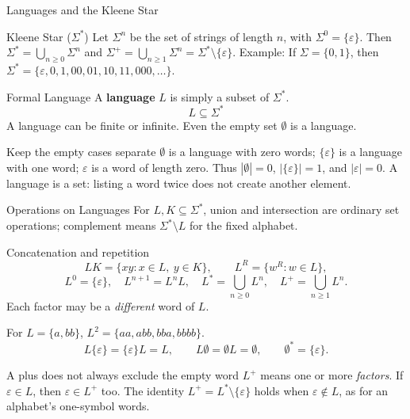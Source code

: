 \documentclass[10pt]{beamer}
\begin{document}
\begin{frame}{Languages and the Kleene Star}
  \small
  \begin{block}{Kleene Star ($\Sigma^*$)}
    Let $\Sigma^n$ be the set of strings of length $n$, with
    $\Sigma^0=\{\varepsilon\}$. Then
    $\Sigma^*=\bigcup_{n\ge0}\Sigma^n$ and
    $\Sigma^+=\bigcup_{n\ge1}\Sigma^n=\Sigma^*\setminus\{\varepsilon\}$.
    \newline Example: If $\Sigma = \{0, 1\}$, then $\Sigma^* = \{\varepsilon, 0, 1, 00, 01, 10, 11, 000, \dots\}$.
  \end{block}
  \pause
  \begin{block}{Formal Language}
    A \textbf{language} $L$ is simply a subset of $\Sigma^*$. 
    $$L \subseteq \Sigma^*$$
    A language can be finite or infinite. Even the empty set $\emptyset$ is a language.
  \end{block}
  \pause
  \begin{alertblock}{Keep the empty cases separate}
    $\emptyset$ is a language with zero words; $\{\varepsilon\}$ is a language
    with one word; $\varepsilon$ is a word of length zero.
    Thus $|\emptyset|=0$, $|\{\varepsilon\}|=1$, and $|\varepsilon|=0$.
    A language is a set: listing a word twice does not create another element.
  \end{alertblock}
\end{frame}

\begin{frame}{Operations on Languages}
  \small
  For $L,K\subseteq\Sigma^*$, union and intersection are ordinary set
  operations; complement means $\Sigma^*\setminus L$ for the fixed alphabet.
  \begin{block}{Concatenation and repetition}
    \[
      LK=\{xy:x\in L,\ y\in K\},\qquad L^R=\{w^R:w\in L\},
    \]
    \[
      L^0=\{\varepsilon\},\quad L^{n+1}=L^nL,\quad
      L^*=\bigcup_{n\ge0}L^n,\quad L^+=\bigcup_{n\ge1}L^n.
    \]
    Each factor may be a \emph{different} word of $L$.
  \end{block}
  \pause
  For $L=\{a,bb\}$, $L^2=\{aa,abb,bba,bbbb\}$.
  \[
    L\{\varepsilon\}=\{\varepsilon\}L=L,\qquad L\emptyset=\emptyset L=\emptyset,
    \qquad \emptyset^*=\{\varepsilon\}.
  \]
  \pause
  \begin{alertblock}{A plus does not always exclude the empty word}
    $L^+$ means one or more \emph{factors}. If $\varepsilon\in L$, then
    $\varepsilon\in L^+$ too. The identity $L^+=L^*\setminus\{\varepsilon\}$
    holds when $\varepsilon\notin L$, as for an alphabet's one-symbol words.
  \end{alertblock}
\end{frame}
\end{document}
